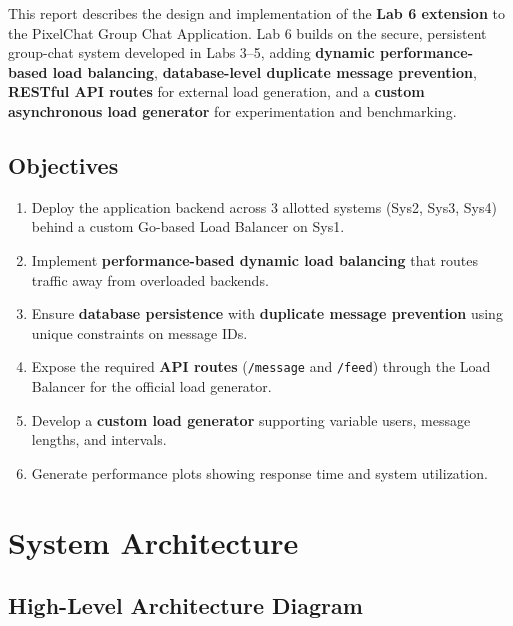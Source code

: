 \documentclass[12pt, a4paper]{article}
\begin{document}
This report describes the design and implementation of the \textbf{Lab 6 extension} to the PixelChat Group Chat Application. Lab 6 builds on the secure, persistent group-chat system developed in Labs 3--5, adding \textbf{dynamic performance-based load balancing}, \textbf{database-level duplicate message prevention}, \textbf{RESTful API routes} for external load generation, and a \textbf{custom asynchronous load generator} for experimentation and benchmarking.

\subsection{Objectives}

\begin{enumerate}[label=\arabic*.]
    \item Deploy the application backend across 3 allotted systems (Sys2, Sys3, Sys4) behind a custom Go-based Load Balancer on Sys1.
    \item Implement \textbf{performance-based dynamic load balancing} that routes traffic away from overloaded backends.
    \item Ensure \textbf{database persistence} with \textbf{duplicate message prevention} using unique constraints on message IDs.
    \item Expose the required \textbf{API routes} (\texttt{/message} and \texttt{/feed}) through the Load Balancer for the official load generator.
    \item Develop a \textbf{custom load generator} supporting variable users, message lengths, and intervals.
    \item Generate performance plots showing response time and system utilization.
\end{enumerate}


\section{System Architecture}

\subsection{High-Level Architecture Diagram}
\end{document}
